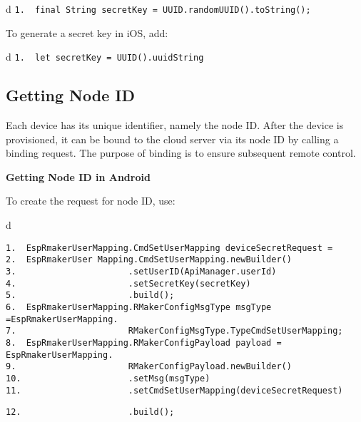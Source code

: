 \documentclass[a4paper,12pt]{book}
\begin{document}
\begin{codebloc}
\begin{tabular}{d}
\verb|1.  final String secretKey = UUID.randomUUID().toString();|
\end{tabular}
\end{codebloc}

To generate a secret key in iOS, add:

\begin{codebloc}
\begin{tabular}{d}
\verb|1.  let secretKey = UUID().uuidString|
\end{tabular}
\end{codebloc}

\subsection{Getting Node ID}
Each device has its unique identifier, namely the node ID. After the device is provisioned, it can be bound to the cloud server via its node ID by calling a binding request. The purpose of binding is to ensure subsequent remote control.

\textbf{Getting Node ID in Android}


To create the request for node ID, use:

\begin{codebloc}
\begin{tabular}{d}
\vspace{2pt}
\begin{verbatim}
1.  EspRmakerUserMapping.CmdSetUserMapping deviceSecretRequest =
2.  EspRmakerUser Mapping.CmdSetUserMapping.newBuilder()
3.                      .setUserID(ApiManager.userId)
4.                      .setSecretKey(secretKey)
5.                      .build();
6.  EspRmakerUserMapping.RMakerConfigMsgType msgType =EspRmakerUserMapping.
7.                      RMakerConfigMsgType.TypeCmdSetUserMapping;
8.  EspRmakerUserMapping.RMakerConfigPayload payload = EspRmakerUserMapping.
9.                      RMakerConfigPayload.newBuilder()
10.                     .setMsg(msgType)
11.                     .setCmdSetUserMapping(deviceSecretRequest)
\end{verbatim}
\verb|12.                     .build();|
\end{tabular}
\end{codebloc}
\end{document}
